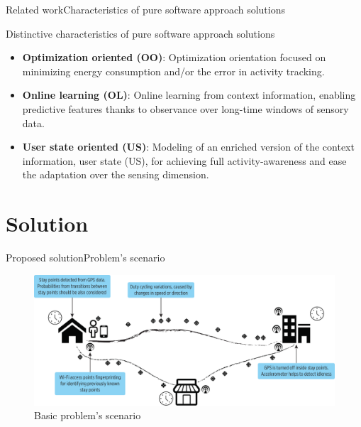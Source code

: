 \documentclass[9pt,xcolor={dvipsnames},handout]{beamer}
\begin{document}
\begin{frame}{Related work}{Characteristics of pure software approach solutions}
\begin{exampleblock}{Distinctive characteristics of pure software approach solutions}
\begin{itemize}
  \item \textbf{Optimization oriented (OO)}: Optimization orientation focused on minimizing energy consumption and/or the error in activity tracking.
  \item \textbf{Online learning (OL)}: Online learning from context information, enabling predictive features thanks to observance over long-time windows of sensory data.
  \item \textbf{User state oriented (US)}: Modeling of an enriched version of the context information, user state (US), for achieving full activity-awareness and ease the adaptation over the sensing dimension.
\end{itemize}
\end{exampleblock}
\end{frame}

\section{Solution}
\begin{frame}{Proposed solution}{Problem's scenario}
\begin{figure}
  \centering
  \includegraphics[width=\textwidth]{vectors/scenario}
  \caption{Basic problem's scenario}
  \label{fig:scenario}
\end{figure}
\end{frame}
\end{document}

